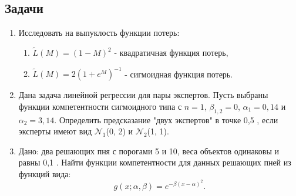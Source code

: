 \subsection*{Задачи}
\begin{enumerate}
    \item Исследовать на выпуклость функции потерь:
          \begin{enumerate}
              \item $\widetilde{L}(M) = (1 - M)^{2}$ - квадратичная функция потерь,
              \item $\widetilde{L}(M) = 2(1 + e^{M})^{-1}$ - сигмоидная функция потерь.
          \end{enumerate}
    \item Дана задача линейной регрессии для пары экспертов. Пусть выбраны функции компетентности сигмоидного типа с $n = 1$, $\beta_{1, 2} = 0$, $\alpha_{1} = 0,14$ и $\alpha_{2} = 3,14$. Определить предсказание "двух экспертов" в точке 0,5 , если эксперты имеют вид $\mathcal{N}_{1}$(0, 2) и $\mathcal{N}_{2}$(1, 1).

    \item Дано: два решающих пня с порогами 5 и 10, веса объектов одинаковы и равны 0,1 . Найти функции компетентности для данных решающих пней из функций вида:
          \begin{equation*}
              g(x;\alpha, \beta) = e^{-\beta (x - \alpha)^{2}}.
          \end{equation*}


\end{enumerate}
